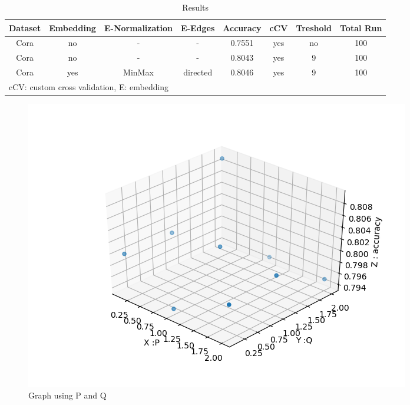 \documentclass{report}
\begin{document}
\begin{table}[htb]
\caption{Results}


\begin{tabular}{|c|c|c|c|c|c|c|c|}
\toprule
Dataset &Embedding & E-Normalization & E-Edges & Accuracy & cCV & Treshold & Total Run\\ \midrule
Cora    &no&  -   & - &  0.7551  & yes  & no & 100\\
Cora    &no	&  -   & - &  0.8043  & yes  & 9 & 100 \\
Cora    &yes&  MinMax   & directed &  0.8046  & yes  & 9 & 100\\
\hline
\multicolumn{5}{l}{cCV: custom cross validation, E: embedding}
\end{tabular}
\end{table}
\begin{figure}[htbp]
\includegraphics[scale=0.7]{34.png}
\caption{Graph using P and Q}
\label{fig:34}
\end{figure}




\end{document}
